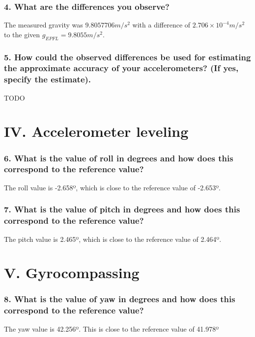 \documentclass{article}
\newcommand{\e}[1]{\times 10^{#1}} %
\begin{document}
\subsubsection*{4. What are the differences you observe?}

The measured gravity was $9.8057706 \si{m/s^2}$ with a difference of $2.706\e{-4} \si{m/s^2}$ to the given $g_{EPFL} = 9.8055 \si{m/s^2}$.

\subsubsection*{5. How could the observed differences be used for estimating the approximate
accuracy of your accelerometers? (If yes, specify the estimate).}

TODO

\section*{IV. Accelerometer leveling}

\subsubsection*{6. What is the value of roll in degrees and how does this correspond to the reference value?}

The roll value is -2.658º, which is close to the reference value of -2.653º.

\subsubsection*{7. What is the value of pitch in degrees and how does this correspond to the reference value?}

The pitch value is 2.465º, which is close to the reference value of 2.464º.


\section*{V. Gyrocompassing}

\subsubsection*{8. What is the value of yaw in degrees and how does this correspond to the reference value?}

The yaw value is 42.256º. This is close to the reference value of 41.978º
\end{document}
